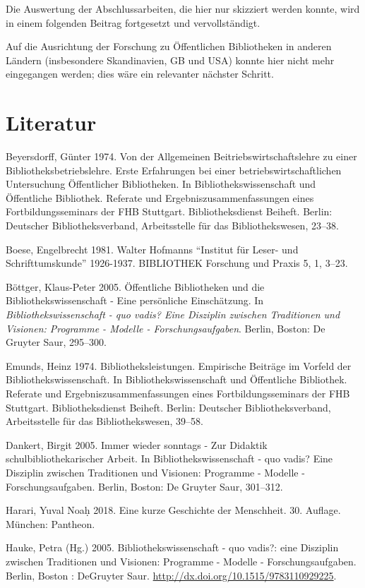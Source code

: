 \documentclass[a4paper,
fontsize=11pt,
oneside,
numbers=noperiodatend,
parskip=half-,
bibliography=totoc,
final
]{scrartcl}
\begin{document}
Die Auswertung der Abschlussarbeiten, die hier nur skizziert werden
konnte, wird in einem folgenden Beitrag fortgesetzt und vervollständigt.

Auf die Ausrichtung der Forschung zu Öffentlichen Bibliotheken in
anderen Ländern (insbesondere Skandinavien, GB und USA) konnte hier
nicht mehr eingegangen werden; dies wäre ein relevanter nächster
Schritt.

\hypertarget{literatur}{%
\section{Literatur}\label{literatur}}

Beyersdorff, Günter 1974. Von der Allgemeinen Beitriebswirtschaftslehre
zu einer Bibliotheksbetriebslehre. Erste Erfahrungen bei einer
betriebswirtschaftlichen Untersuchung Öffentlicher Bibliotheken. In
Bibliothekswissenschaft und Öffentliche Bibliothek. Referate und
Ergebniszusammenfassungen eines Fortbildungsseminars der FHB Stuttgart.
Bibliotheksdienst Beiheft. Berlin: Deutscher Bibliotheksverband,
Arbeitsstelle für das Bibliothekswesen, 23--38.

Boese, Engelbrecht 1981. Walter Hofmanns \enquote{Institut für Leser-
und Schrifttumskunde} 1926-1937. BIBLIOTHEK Forschung und Praxis 5, 1,
3--23.

Böttger, Klaus-Peter 2005. Öffentliche Bibliotheken und die
Bibliothekswissenschaft - Eine persönliche Einschätzung. In
\emph{Bibliothekswissenschaft - quo vadis? Eine Disziplin zwischen
Traditionen und Visionen: Programme - Modelle - Forschungsaufgaben}.
Berlin, Boston: De Gruyter Saur, 295--300.

Emunds, Heinz 1974. Bibliotheksleistungen. Empirische Beiträge im
Vorfeld der Bibliothekswissenschaft. In Bibliothekswissenschaft und
Öffentliche Bibliothek. Referate und Ergebniszusammenfassungen eines
Fortbildungsseminars der FHB Stuttgart. Bibliotheksdienst Beiheft.
Berlin: Deutscher Bibliotheksverband, Arbeitsstelle für das
Bibliothekswesen, 39--58.

Dankert, Birgit 2005. Immer wieder sonntags - Zur Didaktik
schulbibliothekarischer Arbeit. In Bibliothekswissenschaft - quo vadis?
Eine Disziplin zwischen Traditionen und Visionen: Programme - Modelle -
Forschungsaufgaben. Berlin, Boston: De Gruyter Saur, 301--312.

Harari, Yuval Noaḥ 2018. Eine kurze Geschichte der Menschheit. 30.
Auflage. München: Pantheon.

Hauke, Petra (Hg.) 2005. Bibliothekswissenschaft - quo vadis?: eine
Disziplin zwischen Traditionen und Visionen: Programme - Modelle -
Forschungsaufgaben. Berlin, Boston : DeGruyter Saur.
\url{http://dx.doi.org/10.1515/9783110929225}.
\end{document}
